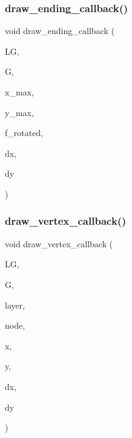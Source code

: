 \subsubsection{\texorpdfstring{draw\+\_\+ending\+\_\+callback()}{draw\_ending\_callback()}}
{\footnotesize\ttfamily void draw\+\_\+ending\+\_\+callback (\begin{DoxyParamCaption}\item[{\mbox{\hyperlink{classlayered__graph}{layered\+\_\+graph}} $\ast$}]{LG,  }\item[{\mbox{\hyperlink{classmp__graphics}{mp\+\_\+graphics}} $\ast$}]{G,  }\item[{\mbox{\hyperlink{galois_8h_a09fddde158a3a20bd2dcadb609de11dc}{I\+NT}}}]{x\+\_\+max,  }\item[{\mbox{\hyperlink{galois_8h_a09fddde158a3a20bd2dcadb609de11dc}{I\+NT}}}]{y\+\_\+max,  }\item[{\mbox{\hyperlink{galois_8h_a09fddde158a3a20bd2dcadb609de11dc}{I\+NT}}}]{f\+\_\+rotated,  }\item[{\mbox{\hyperlink{galois_8h_a09fddde158a3a20bd2dcadb609de11dc}{I\+NT}}}]{dx,  }\item[{\mbox{\hyperlink{galois_8h_a09fddde158a3a20bd2dcadb609de11dc}{I\+NT}}}]{dy }\end{DoxyParamCaption})}

\mbox{\label{layered__graph__main_8_c_a12172e73c4ca6e742bcac2a0f48e3247}} 
\subsubsection{\texorpdfstring{draw\+\_\+vertex\+\_\+callback()}{draw\_vertex\_callback()}}
{\footnotesize\ttfamily void draw\+\_\+vertex\+\_\+callback (\begin{DoxyParamCaption}\item[{\mbox{\hyperlink{classlayered__graph}{layered\+\_\+graph}} $\ast$}]{LG,  }\item[{\mbox{\hyperlink{classmp__graphics}{mp\+\_\+graphics}} $\ast$}]{G,  }\item[{\mbox{\hyperlink{galois_8h_a09fddde158a3a20bd2dcadb609de11dc}{I\+NT}}}]{layer,  }\item[{\mbox{\hyperlink{galois_8h_a09fddde158a3a20bd2dcadb609de11dc}{I\+NT}}}]{node,  }\item[{\mbox{\hyperlink{galois_8h_a09fddde158a3a20bd2dcadb609de11dc}{I\+NT}}}]{x,  }\item[{\mbox{\hyperlink{galois_8h_a09fddde158a3a20bd2dcadb609de11dc}{I\+NT}}}]{y,  }\item[{\mbox{\hyperlink{galois_8h_a09fddde158a3a20bd2dcadb609de11dc}{I\+NT}}}]{dx,  }\item[{\mbox{\hyperlink{galois_8h_a09fddde158a3a20bd2dcadb609de11dc}{I\+NT}}}]{dy }\end{DoxyParamCaption})}

